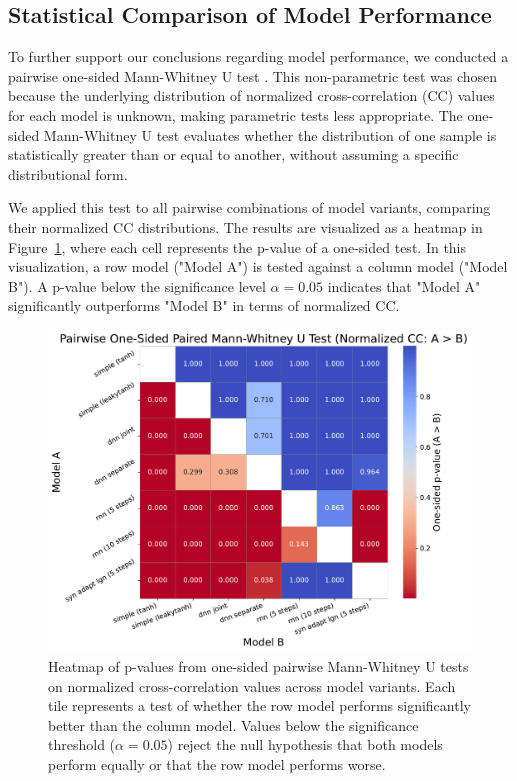 \subsection{Statistical Comparison of Model Performance}
\label{subsec:model_performance_statistical_comparison}

To further support our conclusions regarding model performance, we conducted a pairwise one-sided Mann-Whitney U test \citep{mann_whithey_1947}. This non-parametric test was chosen because the underlying distribution of normalized cross-correlation (CC) values for each model is unknown, making parametric tests less appropriate. The one-sided Mann-Whitney U test evaluates whether the distribution of one sample is statistically greater than or equal to another, without assuming a specific distributional form.

We applied this test to all pairwise combinations of model variants, comparing their normalized CC distributions. The results are visualized as a heatmap in Figure~\ref{fig:model_types_p_values_heatmap}, where each cell represents the p-value of a one-sided test. In this visualization, a row model ("Model A") is tested against a column model ("Model B"). A p-value below the significance level $\alpha = 0.05$ indicates that "Model A" significantly outperforms "Model B" in terms of normalized CC.

\begin{figure}
    \centering
    \includegraphics[width=\linewidth]{img/plots/model_types_p_value_heatmap_cc_norm.pdf}
    \caption{Heatmap of p-values from one-sided pairwise Mann-Whitney U tests on normalized cross-correlation values across model variants. Each tile represents a test of whether the row model performs significantly better than the column model. Values below the significance threshold ($\alpha = 0.05$) reject the null hypothesis that both models perform equally or that the row model performs worse.}
    \label{fig:model_types_p_values_heatmap}
\end{figure}

